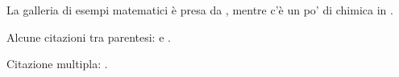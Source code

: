 \documentclass{article}
\begin{document}
La galleria di esempi matematici è presa da \citet{Graham1995},
mentre c'è un po' di chimica in \citet{Thomas2008}.

Alcune citazioni tra parentesi: \citep{Graham1995}
e \citep[p.~56]{Thomas2008}.

\citep[Vedi][pp.~45–48]{Graham1995}

Citazione multipla: \citep{Graham1995,Thomas2008}.

\end{document}

